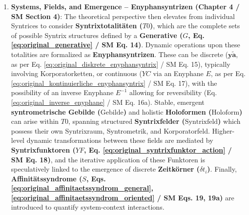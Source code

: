\documentclass[12pt]{article}
\newcommand{\syntrixtotalitaet}{T0}
\newcommand{\generative}{G}
\newcommand{\syntrixfeld}{\text{Syntrixfeld}}
\newcommand{\diskreteEnyphansyntrix}{\bm{y\widetilde{a}}}
\newcommand{\kontinuierlicheEnyphansyntrix}{YC}
\newcommand{\enyphane}{E}
\newcommand{\syntrometrischesGebilde}{\text{Gebilde}}
\newcommand{\holoform}{\text{Holoform}}
\newcommand{\syntrixfunktor}{YF}
\newcommand{\zeitkorn}{\delta t_i}
\newcommand{\affinitaetssyndrom}{S}
\begin{document}
\begin{enumerate}
    \item \textbf{Systems, Fields, and Emergence – Enyphansyntrizen (Chapter 4 / SM Section 4)}: The theoretical perspective then elevates from individual Syntrices to consider \textbf{Syntrixtotalitäten (\( \syntrixtotalitaet \))}, which are the complete sets of possible Syntrix structures defined by a \textbf{Generative (\( \generative \), Eq. \eqref{eq:original_generative} / SM Eq. 14)}. Dynamic operations upon these totalities are formalized as \textbf{Enyphansyntrizen}. These can be discrete (\( \diskreteEnyphansyntrix \), as per Eq. \eqref{eq:original_diskrete_enyphansyntrix} / SM Eq. 15), typically involving Korporatorketten, or continuous (\( \kontinuierlicheEnyphansyntrix \) via an Enyphane \( \enyphane \), as per Eq. \eqref{eq:original_kontinuierliche_enyphansyntrix} / SM Eq. 17), with the possibility of an inverse Enyphane \( \enyphane^{-1} \) allowing for reversibility (Eq. \eqref{eq:original_inverse_enyphane} / SM Eq. 16a). Stable, emergent \textbf{syntrometrische Gebilde (\(\syntrometrischesGebilde\))} and holistic \textbf{Holoformen (\(\holoform\))} can arise within \( \syntrixtotalitaet \), spanning structured \textbf{Syntrixfelder (\(\syntrixfeld\))} which possess their own Syntrixraum, Syntrometrik, and Korporatorfeld. Higher-level dynamic transformations between these fields are mediated by \textbf{Syntrixfunktoren (\( \syntrixfunktor \), Eq. \eqref{eq:original_syntrixfunktor_action} / SM Eq. 18)}, and the iterative application of these Funktoren is speculatively linked to the emergence of discrete \textbf{Zeitkörner (\(\zeitkorn\))}. Finally, \textbf{Affinitätssyndrome (\( \affinitaetssyndrom \), Eqs. \eqref{eq:original_affinitaetssyndrom_general}, \eqref{eq:original_affinitaetssyndrom_oriented} / SM Eqs. 19, 19a)} are introduced to quantify system-context interactions.


\end{enumerate}
\end{document}
